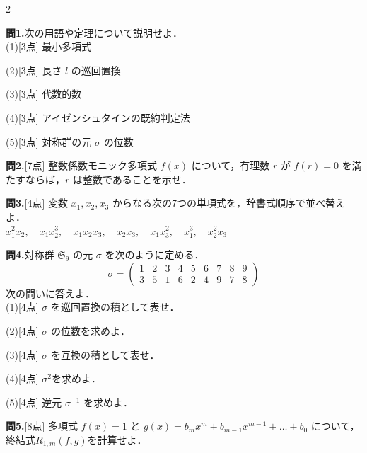 \documentclass[a4paper,11pt]{jsarticle}
\begin{document}
\begin{multicols*}{2}

\noindent
\textbf{問1.}\quad 次の用語や定理について説明せよ．\\[1em]
(1)[3点] 最小多項式
\vspace{4cm}

\noindent
(2)[3点] 長さ $l$ の巡回置換
\vspace{4cm}

\noindent
(3)[3点] 代数的数
\vspace{4cm}

\noindent
(4)[3点] アイゼンシュタインの既約判定法
\vspace{4cm}

\noindent
(5)[3点] 対称群の元 $\sigma$ の位数
\vspace{4cm}

\vfill\null
\columnbreak
\noindent
\textbf{問2.}[7点] 整数係数モニック多項式 $f(x)$ について，有理数 $r$ が $f(r)=0$ を満たすならば，$r$ は整数であることを示せ．
\vspace{15cm}

\noindent
\textbf{問3.}[4点] 変数 $x_1, x_2, x_3$ からなる次の7つの単項式を，辞書式順序で並べ替えよ．\\[1em]
$x_1^2 x_2, \quad x_1x_2^3, \quad x_1 x_2 x_3, \quad x_2x_3, \quad x_1 x_3^2, \quad x_1^3, \quad x_2^2 x_3$
\vspace{7cm}

\vfill\null

\newpage
\noindent
\textbf{問4.}\quad 対称群 $\mathfrak{S}_9$ の元 $\sigma$ を次のように定める．
$$\sigma = \begin{pmatrix} 1 & 2 & 3 & 4 & 5 & 6 & 7 & 8 & 9 \\ 3 & 5 & 1 & 6 & 2 & 4 & 9 & 7 & 8 \end{pmatrix}$$
次の問いに答えよ．\\
(1)[4点] $\sigma$ を巡回置換の積として表せ．
\vspace{4cm}

\noindent
(2)[4点] $\sigma$ の位数を求めよ．
\vspace{4cm}

\noindent
(3)[4点] $\sigma$ を互換の積として表せ．
\vspace{4cm}

\noindent
(4)[4点] $\sigma^2$を求めよ．
\vspace{4cm}

\noindent
(5)[4点] 逆元 $\sigma^{-1}$ を求めよ．
\vspace{4cm}

\vfill\null
\columnbreak
\noindent
\textbf{問5.}[8点] 多項式 $f(x) = 1$ と $g(x) = b_m x^m + b_{m-1}x^{m-1} + \dots + b_0$ について，終結式$R_{1,m}(f,g)$を計算せよ．
\vspace{22cm}

\vfill\null
\end{multicols*}
\end{document}
